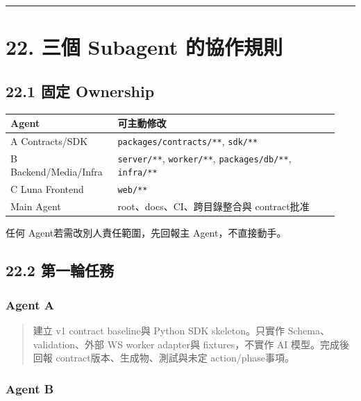 \documentclass[
  9pt,
  a4paper,
]{article}
\begin{document}
\begin{center}\rule{0.5\linewidth}{0.5pt}\end{center}

\section{22. 三個 Subagent
的協作規則}\label{22-ux4e09ux500b-subagent-ux7684ux5354ux4f5cux898fux5247}

\subsection{22.1 固定 Ownership}\label{221-ux56faux5b9a-ownership}

\begin{longtable}[]{@{}>{\RaggedRight\arraybackslash}p{0.30\linewidth}>{\RaggedRight\arraybackslash}p{0.64\linewidth}@{}}
\toprule\noalign{}
Agent & 可主動修改 \\
\midrule\noalign{}
\endhead
\bottomrule\noalign{}
\endlastfoot
A Contracts/SDK & \texttt{packages/contracts/**}, \texttt{sdk/**} \\
B Backend/Media/Infra & \texttt{server/**}, \texttt{worker/**},
\texttt{packages/db/**}, \texttt{infra/**} \\
C Luna Frontend & \texttt{web/**} \\
Main Agent & root、docs、CI、跨目錄整合與 contract批准 \\
\end{longtable}

任何 Agent若需改別人責任範圍，先回報主 Agent，不直接動手。

\subsection{22.2 第一輪任務}\label{222-ux7b2cux4e00ux8f2aux4efbux52d9}

\subsubsection{Agent A}\label{agent-a}

\begin{quote}
建立 v1 contract baseline與 Python SDK skeleton。只實作
Schema、validation、外部 WS worker adapter與 fixtures，不實作 AI
模型。完成後回報 contract版本、生成物、測試與未定 action/phase事項。
\end{quote}

\subsubsection{Agent B}\label{agent-b}
\end{document}
